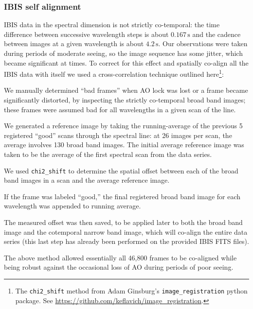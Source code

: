 \documentclass[twocolumn]{aastex62}
\newcommand{\unit}[1]{\ensuremath{\, \mathrm{#1}}}
\begin{document}
\subsubsection{IBIS self alignment}\label{sec:ibisselfalign}
IBIS data in the spectral dimension is not strictly co-temporal: the time difference between successive wavelength steps is about $0.167\unit{s}$ and the cadence between images at a given wavelength is about $4.2\unit{s}$.
Our observations were taken during periods of moderate seeing, so the image sequence has some jitter, which became significant at times.  
To correct for this effect and spatially co-align all the IBIS data with itself we used a cross-correlation technique outlined here\footnote{The \texttt{chi2\_shift} method from Adam Ginsburg's \texttt{image\_registration} python package.  See \url{https://github.com/keflavich/image_registration}.}: 
\begin{enumerate}
    {\item We manually determined ``bad frames'' when AO lock was lost or a frame became significantly distorted, by inspecting the strictly co-temporal broad band images; these frames were assumed bad for all wavelengths in a given scan of the line.}
    {\item We generated a reference image by taking the running-average of the previous 5 registered ``good'' scans through the spectral line: at 26 images per scan, the average involves 130 broad band images.
    The initial average reference image was taken to be the average of the first spectral scan from the data series.}
    {\item We used \texttt{chi2\_shift} to determine the spatial offset between each of the broad band images in a scan and the average reference image.}
    {\item If the frame was labeled ``good,'' the final registered broad band image for each wavelength was appended to running average.}
    {\item The measured offset was then saved, to be applied later to both the broad band image and the cotemporal narrow band image, which will co-align the entire data series (this last step has already been performed on the provided IBIS FITS files).}
\end{enumerate}

The above method allowed essentially all 46,800 frames to be co-aligned while being robust against the occasional loss of AO during periods of poor seeing.\par
\end{document}

